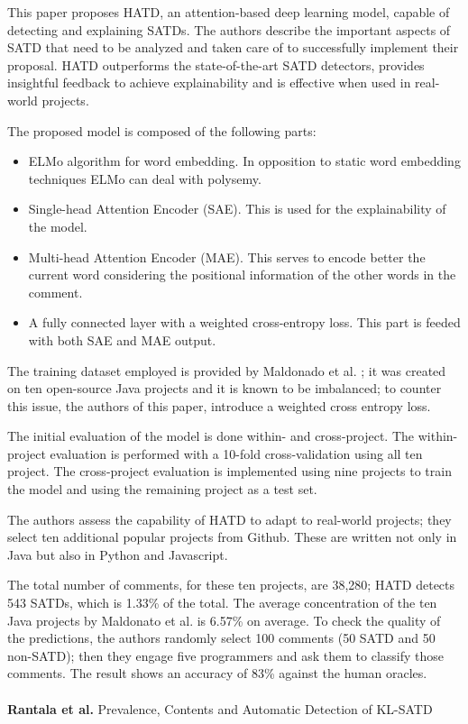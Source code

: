 This paper proposes HATD, an attention-based deep learning model, capable of detecting and explaining SATDs. The authors describe the important aspects of SATD that need to be analyzed and taken care of to successfully implement their proposal. HATD outperforms the state-of-the-art SATD detectors, provides insightful feedback to achieve explainability and is effective when used in real-world projects.

The proposed model is composed of the following parts:
\begin{itemize}
    \item ELMo algorithm for word embedding. In opposition to static word embedding techniques ELMo can deal with polysemy.
    \item Single-head Attention Encoder (SAE). This is used for the explainability of the model.
    \item Multi-head Attention Encoder (MAE). This serves to encode better the current word considering the positional information of the other words in the comment.
    \item A fully connected layer with a weighted cross-entropy loss. This part is feeded with both SAE and MAE output. 
\end{itemize}

The training dataset employed is provided by Maldonado et al. \cite{maldonado2017using}; it was created on ten open-source Java projects and it is known to be imbalanced; to counter this issue, the authors of this paper, introduce a weighted cross entropy loss. 

The initial evaluation of the model is done within- and cross-project. The within-project evaluation is performed with a 10-fold cross-validation using all ten project. The cross-project evaluation is implemented using nine projects to train the model and using the remaining project as a test set.

The authors assess the capability of HATD to adapt to real-world projects; they select ten additional popular projects from Github. These are written not only in Java but also in Python and Javascript. 

The total number of comments, for these ten projects, are 38,280; HATD detects 543 SATDs, which is 1.33\% of the total. The average concentration of the ten Java projects by Maldonato et al. is 6.57\% on average.
To check the quality of the predictions, the authors randomly select 100 comments (50 SATD and 50 non-SATD); then they engage five programmers and ask them to classify those comments. The result shows an accuracy of 83\% against the human oracles.
\\
\\
\textbf{Rantala et al.} \cite{rantala2020prevalence} Prevalence, Contents and Automatic Detection of KL-SATD

